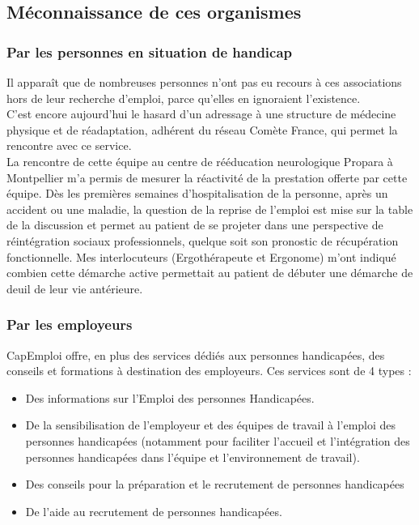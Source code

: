 \subsection{Méconnaissance de ces organismes}
\subsubsection{Par les personnes en situation de handicap}
Il apparaît que de nombreuses personnes n'ont pas eu recours à ces associations hors de leur recherche d'emploi, parce qu'elles en ignoraient l'existence.\\

C'est encore aujourd'hui le hasard d'un adressage à une structure de médecine physique et de réadaptation, adhérent du réseau Comète France, qui permet la rencontre avec ce service. \\

La rencontre de cette équipe au centre de rééducation neurologique Propara à Montpellier m'a permis de mesurer la réactivité de la prestation offerte par cette équipe. Dès les premières semaines d'hospitalisation de la personne, après un accident ou une maladie, la question de la reprise de l'emploi est mise sur la table de la discussion et permet au patient de se projeter dans une perspective de réintégration sociaux professionnels, quelque soit son pronostic de récupération fonctionnelle. Mes interlocuteurs (Ergothérapeute et Ergonome) m'ont indiqué combien cette démarche active permettait au patient de débuter une démarche de deuil de leur vie antérieure.

\subsubsection{Par les employeurs}
CapEmploi offre, en plus des services dédiés aux personnes handicapées, des conseils et formations à destination des employeurs.
Ces services sont de 4 types :
\begin{itemize}
\item Des informations sur l'Emploi des personnes Handicapées.
\item De la sensibilisation de l'employeur et des équipes de travail à l'emploi des personnes handicapées (notamment pour faciliter l'accueil et l'intégration des personnes handicapées dans l'équipe et l'environnement de travail).
\item Des conseils pour la préparation et le recrutement de personnes handicapées
\item De l'aide au recrutement de personnes handicapées.\\
\end{itemize}

